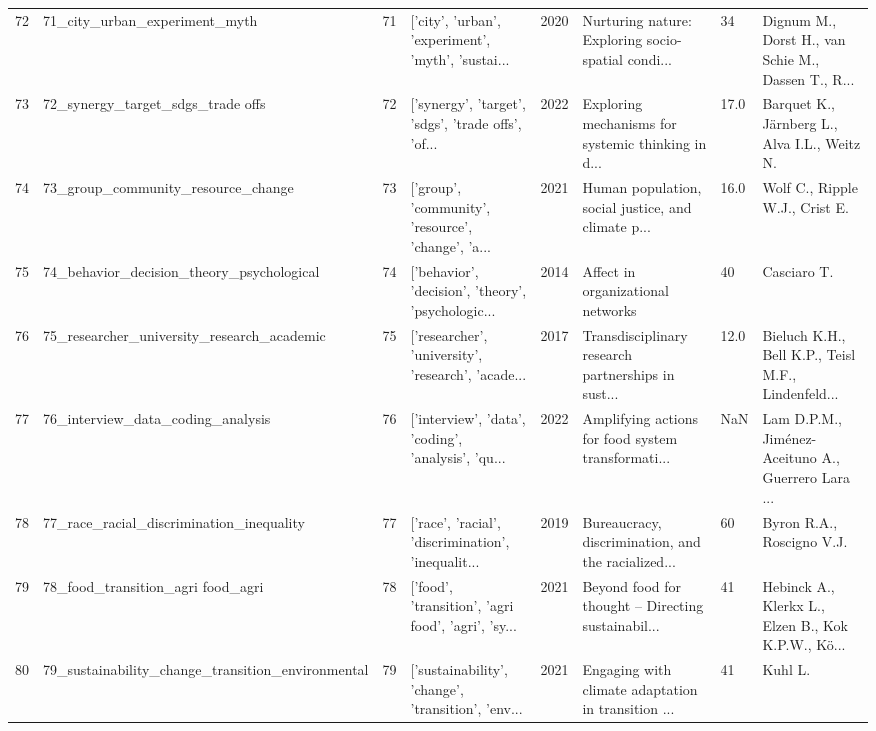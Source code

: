 \begin{tabular}{rlrlrlll}
         72 &                      71\_city\_urban\_experiment\_myth &        71 & ['city', 'urban', 'experiment', 'myth', 'sustai... &          2020 & Nurturing nature: Exploring socio-spatial condi... &      34 & Dignum M., Dorst H., van Schie M., Dassen T., R... \\
         73 &                  72\_synergy\_target\_sdgs\_trade offs &        72 & ['synergy', 'target', 'sdgs', 'trade offs', 'of... &          2022 & Exploring mechanisms for systemic thinking in d... &    17.0 &       Barquet K., Järnberg L., Alva I.L., Weitz N. \\
         74 &                 73\_group\_community\_resource\_change &        73 & ['group', 'community', 'resource', 'change', 'a... &          2021 & Human population, social justice, and climate p... &    16.0 &                     Wolf C., Ripple W.J., Crist E. \\
         75 &          74\_behavior\_decision\_theory\_psychological &        74 & ['behavior', 'decision', 'theory', 'psychologic... &          2014 &                  Affect in organizational networks &      40 &                                        Casciaro T. \\
         76 &         75\_researcher\_university\_research\_academic &        75 & ['researcher', 'university', 'research', 'acade... &          2017 & Transdisciplinary research partnerships in sust... &    12.0 & Bieluch K.H., Bell K.P., Teisl M.F., Lindenfeld... \\
         77 &                  76\_interview\_data\_coding\_analysis &        76 & ['interview', 'data', 'coding', 'analysis', 'qu... &          2022 & Amplifying actions for food system transformati... &     NaN & Lam D.P.M., Jiménez-Aceituno A., Guerrero Lara ... \\
         78 &           77\_race\_racial\_discrimination\_inequality &        77 & ['race', 'racial', 'discrimination', 'inequalit... &          2019 & Bureaucracy, discrimination, and the racialized... &      60 &                          Byron R.A., Roscigno V.J. \\
         79 &                  78\_food\_transition\_agri food\_agri &        78 & ['food', 'transition', 'agri food', 'agri', 'sy... &          2021 & Beyond food for thought – Directing sustainabil... &      41 & Hebinck A., Klerkx L., Elzen B., Kok K.P.W., Kö... \\
         80 &  79\_sustainability\_change\_transition\_environmental &        79 & ['sustainability', 'change', 'transition', 'env... &          2021 & Engaging with climate adaptation in transition ... &      41 &                                            Kuhl L. \\

\end{tabular}
